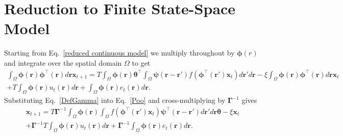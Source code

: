 \documentclass[12pt]{iopart}		%
\begin{document}
\section{Reduction to Finite State-Space Model}\label{Simplifying Decomposition}
Starting from Eq.~\ref{reduced continuous model} we multiply throughout by $\boldsymbol{\phi}(r)$ and integrate over the spatial domain $\Omega$ to get
\begin{eqnarray}\label{Poo}
	\int_\Omega  {\boldsymbol{\phi} \left(\mathbf{r}\right)\boldsymbol{\phi}^{\top}\left(\mathbf{r}\right) d\mathbf{r}} \mathbf{x}_{t+1} = T \int_\Omega  {\boldsymbol{\phi} (\mathbf{r}) \boldsymbol{\theta}^{\top} \int_\Omega  {\boldsymbol{\psi}  \left(\mathbf{r}-\mathbf{r}'\right) f\left(\boldsymbol{\phi}^{\top}\left(\mathbf{r}'\right) \mathbf{x}_t \right)d\mathbf{r}'}d\mathbf{r}} - \xi\int_\Omega {\boldsymbol{\phi}(\mathbf{r})\boldsymbol{\phi}^{\top}(\mathbf{r})d\mathbf{r}} \mathbf{x}_t \\
	+ T \int_\Omega{\boldsymbol{\phi} \left(\mathbf{r}\right) u_t\left(\mathbf{r}\right)d\mathbf{r}} + \int_\Omega{\boldsymbol{\phi} \left(\mathbf{r}\right) e_t\left(\mathbf{r}\right)d\mathbf{r}}.
\end{eqnarray}
Substituting Eq.~\ref{DefGamma} into Eq.~\ref{Poo} and cross-multiplying by $\boldsymbol{\Gamma}^{-1}$ gives 
\begin{eqnarray}\label{Homogeneous SS Model}
	\mathbf{x}_{t+1} = T\boldsymbol{\Gamma}^{ - 1}\int_\Omega {\boldsymbol{\phi}\left(\mathbf{r}\right) \int_\Omega {f\left(\boldsymbol{\phi}^{\top}\left(\mathbf{r}'\right)\mathbf{x}_t\right) \boldsymbol{\psi}^{\top} \left(\mathbf{r}-\mathbf{r}'\right)d\mathbf{r}'} d\mathbf{r}} \boldsymbol{\theta} - \xi \mathbf{x}_t \\
	+ \boldsymbol{\Gamma}^{-1}T \int_\Omega{\boldsymbol{\phi} \left(\mathbf{r}\right) u_t\left(\mathbf{r}\right)d\mathbf{r}} + \boldsymbol{\Gamma}^{-1} \int_\Omega{\boldsymbol{\phi}\left(\mathbf{r}\right)e_t\left(\mathbf{r}\right)d\mathbf{r}}.
\end{eqnarray}
\end{document}
